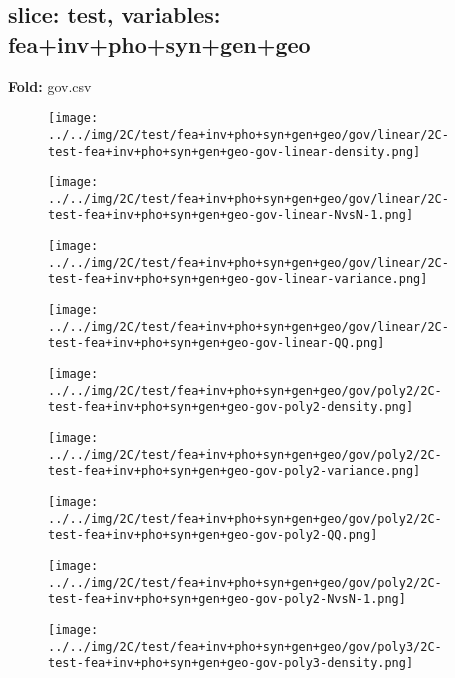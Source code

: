 \subsection{slice: test, variables: fea+inv+pho+syn+gen+geo}
\textbf{Fold:} gov.csv
\begin{figure}[H]
\centering	\texttt{[image: ../../img/2C/test/fea+inv+pho+syn+gen+geo/gov/linear/2C-test-fea+inv+pho+syn+gen+geo-gov-linear-density.png]}
\end{figure}
\begin{figure}[H]
\centering	\texttt{[image: ../../img/2C/test/fea+inv+pho+syn+gen+geo/gov/linear/2C-test-fea+inv+pho+syn+gen+geo-gov-linear-NvsN-1.png]}
\end{figure}
\begin{figure}[H]
\centering	\texttt{[image: ../../img/2C/test/fea+inv+pho+syn+gen+geo/gov/linear/2C-test-fea+inv+pho+syn+gen+geo-gov-linear-variance.png]}
\end{figure}
\begin{figure}[H]
\centering	\texttt{[image: ../../img/2C/test/fea+inv+pho+syn+gen+geo/gov/linear/2C-test-fea+inv+pho+syn+gen+geo-gov-linear-QQ.png]}
\end{figure}
\begin{figure}[H]
\centering	\texttt{[image: ../../img/2C/test/fea+inv+pho+syn+gen+geo/gov/poly2/2C-test-fea+inv+pho+syn+gen+geo-gov-poly2-density.png]}
\end{figure}
\begin{figure}[H]
\centering	\texttt{[image: ../../img/2C/test/fea+inv+pho+syn+gen+geo/gov/poly2/2C-test-fea+inv+pho+syn+gen+geo-gov-poly2-variance.png]}
\end{figure}
\begin{figure}[H]
\centering	\texttt{[image: ../../img/2C/test/fea+inv+pho+syn+gen+geo/gov/poly2/2C-test-fea+inv+pho+syn+gen+geo-gov-poly2-QQ.png]}
\end{figure}
\begin{figure}[H]
\centering	\texttt{[image: ../../img/2C/test/fea+inv+pho+syn+gen+geo/gov/poly2/2C-test-fea+inv+pho+syn+gen+geo-gov-poly2-NvsN-1.png]}
\end{figure}
\begin{figure}[H]
\centering	\texttt{[image: ../../img/2C/test/fea+inv+pho+syn+gen+geo/gov/poly3/2C-test-fea+inv+pho+syn+gen+geo-gov-poly3-density.png]}
\end{figure}
